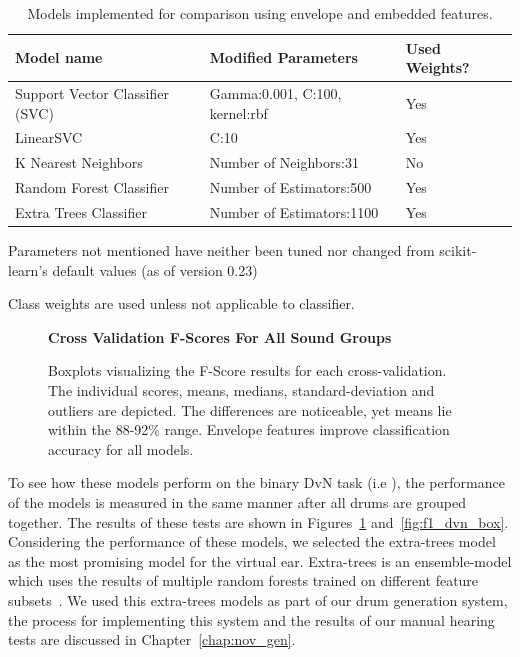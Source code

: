 \documentclass[\main/thesis.tex]{subfiles}
\begin{document}
\begin{table}[t]
    \centering \hspace*{-0.8cm}
    \begin{threeparttable}
    \begin{tabular}[width=0.95\paperwidth]{|l|l|l|}
    \hline
    Model name & Modified Parameters\tnote{\dag}  & Used Weights? \tnote{\ddag} \\\hline
     Support Vector Classifier (SVC) &  Gamma:0.001, C:100, kernel:rbf & Yes\\
     LinearSVC & C:10 & Yes\\
     K Nearest Neighbors & Number of Neighbors:31 &  No \\
     Random Forest Classifier & Number of Estimators:500 & Yes \\
     Extra Trees Classifier & Number of Estimators:1100 & Yes\\
     \hline
    \end{tabular}
    \caption{Models implemented for comparison using envelope and embedded features. }
    \begin{tablenotes}
    \item[\dag] Parameters not mentioned have neither been tuned nor changed from scikit-learn's default values (as of version 0.23)
    \item[\ddag] Class weights are used unless not applicable to classifier.
    \end{tablenotes}
    \label{table:mem_model_selection}
    \end{threeparttable}
\end{table}

\begin{figure}[tbp]
    \begin{center}
    \textbf{Cross Validation F-Scores For All Sound Groups}\par\medskip
    \caption{Boxplots visualizing the F-Score results for each cross-validation. The individual scores, means, medians, standard-deviation and outliers are depicted. The differences are noticeable, yet means lie within the 88-92\% range. Envelope features improve classification accuracy for all models. }
    \label{fig:f1_allg_box}
    \end{center}
\end{figure}

To see how these models perform on the binary DvN task (i.e \decfirst), the performance of the models is measured in the same manner after all drums are grouped together. The results of these tests are shown in Figures~\ref{fig:f1_allg_box} and~\ref{fig:f1_dvn_box}. Considering the performance of these models, we selected the extra-trees model as the most promising model for the virtual ear. Extra-trees is an ensemble-model which uses the results of multiple random forests trained on different feature subsets~\cite{geurts2006extremely,pedregosa2011scikit}. We used this extra-trees models as part of our drum generation system, the process for implementing this system and the results of our manual hearing tests are discussed in Chapter~\ref{chap:nov_gen}.
\end{document}

